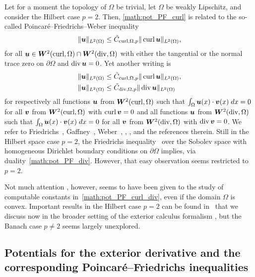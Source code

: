 \documentclass[10pt,letterpaper]{article}
\newcommand\cye[1]{%
  \protect\leavevmode
  \begingroup
    \color{red!35!yellow}%
    #1%
  \endgroup
}
\begin{document}
\cye{Let for a moment the topology of $\Omega$ be trivial, let $\Omega$ be weakly Lipschitz, and consider the Hilbert case $p=2$. Then, \eqref{math:pot_PF_curl} is related to the so-called Poincar\'e--Friedrichs--Weber inequality
\begin{align}
    \label{math:Weber}
    \| \bm{u}\|_{L^{2}(\Omega)} \leq \tilde C_{\operatorname{curl},\Omega,p} \| \operatorname{curl} \bm{u} \|_{L^{2}(\Omega)},
\end{align}
for all $\bm{u} \in \bm{W}^{2}(\operatorname{curl},\Omega) \cap \bm{W}^{2}(\operatorname{div},\Omega)$ with either the tangential or the normal trace zero on $\partial \Omega$ and $\operatorname{div} \bm{u} = 0$. 
Yet another writing is 
\label{math:PF_orth} \begin{align}
    \| \bm{u}\|_{L^{2}(\Omega)} & \leq \tilde C_{\operatorname{curl},\Omega,p} \| \operatorname{curl} \bm{u} \|_{L^{2}(\Omega)}, \label{math:PF_orth_curl}\\
    \| \bm{u}\|_{L^{2}(\Omega)} & \leq \tilde C_{\operatorname{div},\Omega,p} \| \operatorname{div} \bm{u} \|_{L^{2}(\Omega)} \label{math:PF_orth_div}
\end{align}
for respectively all functions $\bm{u}$ from $\bm{W}^{2}(\operatorname{curl},\Omega)$ such that $\int_{\Omega} \bm{u}(x) \cdot \bm{v}(x) \;dx = 0$ for all $\bm{v}$ from $\bm{W}^{2}(\operatorname{curl},\Omega)$ with $\operatorname{curl} \bm{v} = 0$ and all functions $\bm{u}$ from $\bm{W}^{2}(\operatorname{div},\Omega)$ such that $\int_{\Omega} \bm{u}(x) \cdot \bm{v}(x) \;dx = 0$ for all $\bm{v}$ from $\bm{W}^{2}(\operatorname{div},\Omega)$ with $\operatorname{div} \bm{v} = 0$. We refer to Friedrichs~\cite[equation~(5)]{Fried_diff_forms_55}, Gaffney~\cite[equation~(2)]{Gaff_Hilbert_harm_55}, Weber~\cite{Web_compact_Maxw_80}, \cite[Lemmas~3.4 and~3.6]{Gir_Rav_NS_86}, \cite[Proposition~7.4]{Fer_Gil_Maxw_BC_97}, and the references therein. Still} in the Hilbert space case $p=2$, the Friedrichs inequality~\cite{burenkov1998sobolev} over the Sobolev space with \cye{homogeneous} Dirichlet boundary conditions \cye{on $\partial \Omega$} implies, via duality~\eqref{math:pot_PF_div}. However, that easy observation seems restricted to $p=2$. 

Not much attention\cye{, however,} seems to have been given to the study of \cye{computable} constants in~\eqref{math:pot_PF_curl_div}, even if the domain $\Omega$ is convex. \cye{Important results in the Hilbert case $p=2$ can be found in~\cite{guerini2004eigenvalue, Paul_Vald_PF_grad_curl_div_20} that we discuss now in the broader setting of} the exterior calculus formalism\cye{, but the Banach case $p \neq 2$ seems largely unexplored.}

\subsection{\cye{Potentials for the exterior derivative and the corresponding Poincar\'e--Fried\-richs inequalities}} \label{section:intro_EC}
\end{document}
